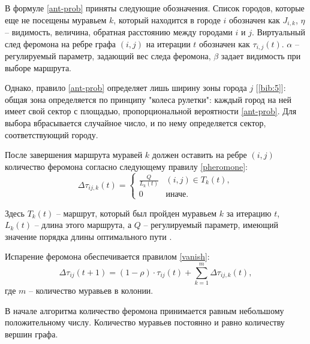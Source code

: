 	\par В формуле \ref{ant-prob} приняты следующие обозначения. Список городов, которые еще не посещены муравьем $k$, который находится в городе $i$ обозначен как $J_{i,k}$, $\eta$ -- видимость, величина, обратная расстоянию между городами $i$ и $j$. Виртуальный след феромона на ребре графа $(i, j)$ на итерации $t$ обозначен как $\tau_{i, j}\left(t\right)$. $\alpha$ -- регулируемый параметр, задающий вес следа феромона, $\beta$ задает видимость при выборе маршрута.

    \par Однако, правило \ref{ant-prob} определяет лишь ширину зоны города $j$ [\ref{bib:5}]: общая зона определяется по принципу "колеса рулетки": каждый город на ней имеет свой сектор с площадью, пропорциональной вероятности \ref{ant-prob}. Для выбора вбрасывается случайное число, и по нему определяется сектор, соответствующий городу.

	\par После завершения маршрута муравей $k$ должен оставить на ребре  $(i, j)$ количество феромона согласно следующему правилу \ref{pheromone}:
	\begin{equation}\label{pheromone}
	\Delta\tau_{ij, k}\left(t\right) = 
	\begin{cases}
	\displaystyle	\frac{Q}{L_k\left(t\right)} & (i, j) \in T_k\left(t\right), \\
	\displaystyle   0 & \text{иначе.}
	\end{cases}
	\end{equation}
	
	\par Здесь $T_k\left(t\right)$ -- маршрут, который был пройден муравьем $k$ за итерацию $t$, $L_k\left(t\right)$ -- длина этого маршрута, а $Q$ -- регулируемый параметр, имеющий значение порядка длины оптимального пути \cite{ant-ulya}.

	\par Испарение феромона обеспечивается правилом \ref{vanish}:
	\begin{equation}\label{vanish}
	\Delta\tau_{ij}\left(t + 1\right) = \left(1 - \rho\right) \cdot \tau_{ij}\left(t\right) + \sum^{m}_{k = 1}\Delta\tau_{ij, k}\left(t\right),
	\end{equation}
	где $m$ -- количество муравьев в колонии.


	\par В начале алгоритма количество феромона принимается равным небольшому положительному числу. Количество муравьев постоянно и равно количеству вершин графа.

